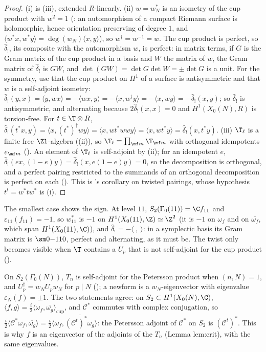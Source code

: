 \begin{proof}
(i) is (iii), extended $R$-linearly. (ii) $w=w_N^*$ is an isometry of the cup product with $w^2=1$ (: an automorphism of a compact Riemann
surface is holomorphic, hence orientation preserving of degree $1$, and $\langle w^*x,w^*y\rangle=\deg(w_N)\langle x,y\rangle$), so $w^\dagger=w^{-1}=w$. The cup
product is perfect, so $\hat\delta_!$, its composite with the automorphism $w$, is perfect: in matrix terms, if $G$ is the Gram matrix of the cup product in a basis and $W$ the matrix of
$w$, the Gram matrix of $\hat\delta_!$ is $GW$, and $\det(GW)=\det G\det W=\pm\det G$ is a unit. For the symmetry, use that the cup product on $H^1$ of a surface is antisymmetric and
that $w$ is a self-adjoint isometry: $\hat\delta_!(y,x)=\langle y,wx\rangle=-\langle wx,y\rangle=-\langle x,w^\dagger y\rangle=-\langle x,wy\rangle=-\hat\delta_!(x,y)$; so
$\hat\delta_!$ is antisymmetric, and alternating because $2\hat\delta_!(x,x)=0$ and $H^1(X_0(N),R)$ is torsion-free. For $t\in\T\otimes R$,
$\hat\delta_!(t^*x,y)=\langle x,(t^*)^\dagger wy\rangle=\langle x,wt^*wwy\rangle=\langle x,wt^*y\rangle=\hat\delta_!(x,t^*y)$. (iii) $\T_\ell$ is a finite free $\Zl$-algebra
((ii)), so $\T_\ell=\prod_{\mf m}\T_{\mf m}$ with orthogonal idempotents $e_{\mf m}$ (). An element of $\T_\ell$ is
self-adjoint by (ii); for an idempotent $e$, $\hat\delta_!(ex,(1-e)y)=\hat\delta_!(x,e(1-e)y)=0$, so the decomposition is orthogonal, and a perfect pairing restricted to the
summands of an orthogonal decomposition is perfect on each (). This is 's corollary on twisted pairings, whose hypothesis $t^t=w^*tw^*$ is
(i).
\end{proof}

The smallest case shows the sign. At level $11$, $S_2(\Gamma_0(11))=\C f_{11}$ and $\varepsilon_{11}(f_{11})=-1$, so $w_{11}^*$ is $-1$ on $H^1(X_0(11),\Z)\simeq\Z^2$ (it is $-1$ on
$\omega_f$ and on $\overline{\omega_f}$, which span $H^1(X_0(11),\C)$), and $\hat\delta_!=-\langle\ ,\ \rangle$: in a symplectic basis its Gram matrix is $\sm0{-1}10$, perfect and
alternating, as it must be. The twist only becomes visible when $\T$ contains a $U_p$ that is not self-adjoint for the cup product ().

\begin{remark}\label{rem:moddeg:petersson-analogue}
On $S_2(\Gamma_0(N))$, $T_n$ is self-adjoint for the Petersson product when $(n,N)=1$, and $U_p^\dagger=w_NU_pw_N$ for $p\mid N$ (); a newform is a $w_N$-eigenvector
with eigenvalue $\varepsilon_N(f)=\pm1$. The two statements agree: on $S_2\subset H^1(X_0(N),\C)$, $\langle f,g\rangle=\frac i2\langle\omega_f,\overline{\omega_g}\rangle_{\mathrm{cup}}$, and $\mathcal C^*$
commutes with complex conjugation, so $\frac i2\langle\mathcal C^*\omega_f,\overline{\omega_g}\rangle=\frac i2\langle\omega_f,\overline{(\mathcal C^t)^*\omega_g}\rangle$: the Petersson adjoint of $\mathcal C^*$ on $S_2$ is
$(\mathcal C^t)^*$. This is why $f$ is an eigenvector of the adjoints of the $T_n$ (Lemma lem:crit), with the same eigenvalues.
\end{remark}

